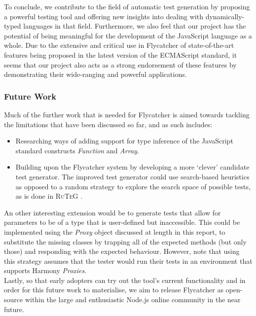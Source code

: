 To conclude, we contribute to the field of automatic test generation by proposing a powerful testing tool and offering new insights into dealing with dynamically-typed languages in that field. Furthermore, we also feel that our project has the potential of being meaningful for the development of the JavaScript language as a whole. Due to the extensive and critical use in \textsf{Flycatcher} of state-of-the-art features being proposed in the latest version of the ECMAScript standard, it seems that our project also acts as a strong endorsement of these features by demonstrating their wide-ranging and powerful applications.

\subsubsection{Future Work}

Much of the further work that is needed for \textsf{Flycatcher} is aimed towards tackling the limitations that have been discussed so far, and as such includes:

\begin{itemize}
   \item Researching ways of adding support for type inference of the JavaScript standard constructs \textit{Function} and \textit{Array}.
   \item Building upon the \textsf{Flycatcher} system by developing a more `clever' candidate test generator. The improved test generator could use search-based heuristics as opposed to a random strategy to explore the search space of possible tests, as is done in \textsc{RuTeG} \cite{mairhofer2008search}.
\end{itemize}

An other interesting extension would be to generate tests that allow for parameters to be of a type that is user-defined but inaccessible. This could be implemented using the \emph{Proxy} object discussed at length in this report, to substitute the missing classes by trapping all of the expected methods (but only those) and responding with the expected behaviour. However, note that using this strategy assumes that the tester would run their tests in an environment that supports Harmony \emph{Proxies}.\\

Lastly, so that early adopters can try out the tool's current functionality and in order for this future work to materialise, we aim to release \textsf{Flycatcher} as open-source within the large and enthusiastic \textsf{Node.js} online community in the near future.




